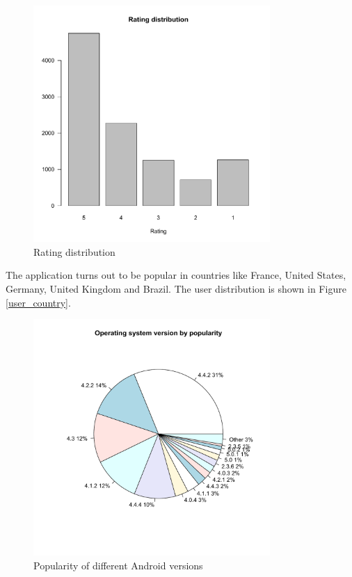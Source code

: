 \begin{figure}[htb]
\centering \includegraphics[height=9cm]{charts/rating_distribution}
\caption{Rating distribution\label{ratings}}
\end{figure}


The application turns out to be popular in countries like France, United States, Germany, United Kingdom and Brazil. The user distribution is shown in Figure \ref{user_country}.

\begin{figure}[htb]
\centering \includegraphics[height=9cm]{charts/os_version_popularity}
\caption{Popularity of different Android versions \label{os_versions}}
\end{figure}

